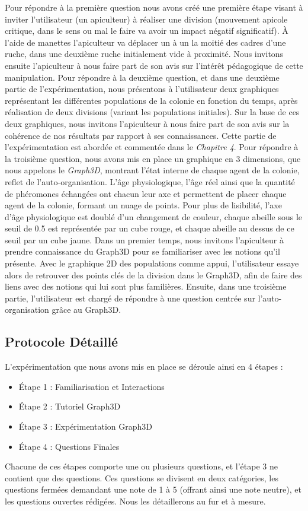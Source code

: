     Pour répondre à la première question nous avons créé une première étape visant à inviter l'utilisateur (un apiculteur) à réaliser une division (mouvement apicole critique, dans le sens ou mal le faire va avoir un impact négatif significatif). À l'aide de manettes l'apiculteur va déplacer un à un la moitié des cadres d'une ruche, dans une deuxième ruche initialement vide à proximité. Nous invitons ensuite l'apiculteur à nous faire part de son avis sur l'intérêt pédagogique de cette manipulation.
    Pour répondre à la deuxième question, et dans une deuxième partie de l'expérimentation, nous présentons à l'utilisateur deux graphiques représentant les différentes populations de la colonie en fonction du temps, après réalisation de deux divisions (variant les populations initiales). Sur la base de ces deux graphiques, nous invitons l'apiculteur à nous faire part de son avis sur la cohérence de nos résultats par rapport à ses connaissances. Cette partie de l'expérimentation est abordée et commentée dans le \textit{Chapitre 4}.
    Pour répondre à la troisième question, nous avons mis en place un graphique en 3 dimensions, que nous appelons le \textit{Graph3D}, montrant l'état interne de chaque agent de la colonie, reflet de l'auto-organisation. L'âge physiologique, l'âge réel ainsi que la quantité de phéromones échangées ont chacun leur axe et permettent de placer chaque agent de la colonie, formant un nuage de points. Pour plus de lisibilité, l'axe d'âge physiologique est doublé d'un changement de couleur, chaque abeille sous le seuil de 0.5 est représentée par un cube rouge, et chaque abeille au dessus de ce seuil par un cube jaune. Dans un premier temps, nous invitons l'apiculteur à prendre connaissance du Graph3D pour se familiariser avec les notions qu'il présente. Avec le graphique 2D des populations comme appui, l'utilisateur essaye alors de retrouver des points clés de la division dans le Graph3D, afin de faire des liens avec des notions qui lui sont plus familières. Ensuite, dans une troisième partie, l'utilisateur est chargé de répondre à une question centrée sur l'auto-organisation grâce au Graph3D.

		
		\subsection{Protocole Détaillé}
		
		L'expérimentation que nous avons mis en place se déroule ainsi en 4 étapes :
		\begin{itemize}
			\item Étape 1 : Familiarisation et Interactions
			\item Étape 2 : Tutoriel Graph3D
			\item Étape 3 : Expérimentation Graph3D
			\item Étape 4 : Questions Finales
		\end{itemize}
		Chacune de ces étapes comporte une ou plusieurs questions, et l'étape 3 ne contient que des questions. Ces questions se divisent en deux catégories, les questions fermées demandant une note de 1 à 5 (offrant ainsi une note neutre), et les questions ouvertes rédigées. Nous les détaillerons au fur et à mesure.
		
